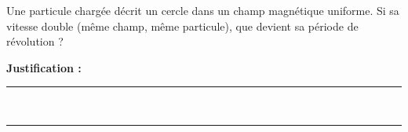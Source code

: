 Une particule chargée décrit un cercle dans un champ magnétique uniforme. Si sa vitesse double (même champ, même particule), que devient sa période de révolution ?

\choices

\noindent\textbf{Justification :} \hrulefill \\[2.5ex]
\rule{\linewidth}{0.4pt} \\[2.5ex]
\rule{\linewidth}{0.4pt}
\vfill

